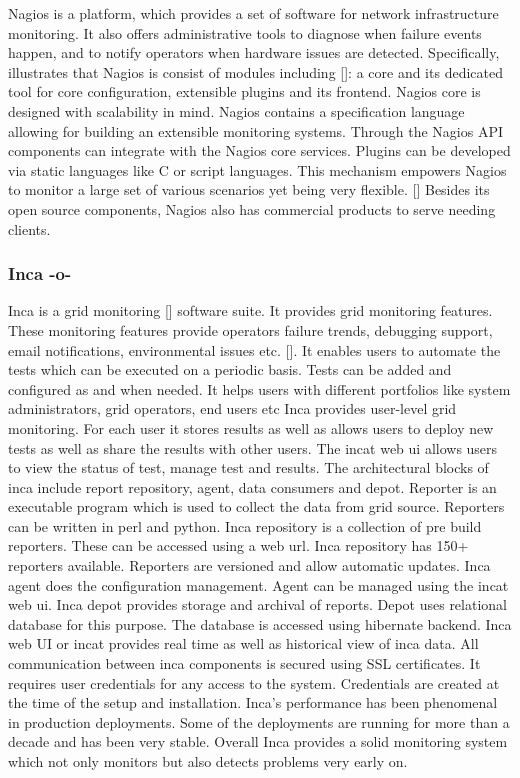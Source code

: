 Nagios is a platform, which provides a set of software for network
infrastructure monitoring. It also offers administrative tools to
diagnose when failure events happen, and to notify operators when
hardware issues are detected. Specifically, illustrates that Nagios is
consist of modules including [\cite{nagios-book}]: a core and its
dedicated tool for core configuration, extensible plugins and its
frontend. Nagios core is designed with scalability in mind.  Nagios
contains a specification language allowing for building an extensible
monitoring systems.  Through the Nagios API components can integrate
with the Nagios core services. Plugins can be developed via static
languages like C or script languages. This mechanism empowers Nagios
to monitor a large set of various scenarios yet being very
flexible. [\cite{nagios-paper-2012}] Besides its open source components,
Nagios also has commercial products to serve needing clients.


\subsubsection{Inca -o-}

Inca is a grid monitoring [\cite{inca-book}] software suite. It provides
grid monitoring features. These monitoring features provide operators
failure trends, debugging support, email notifications, environmental
issues etc. [\cite{www-inca}]. It enables users to automate the tests
which can be executed on a periodic basis. Tests can be added and
configured as and when needed. It helps users with different
portfolios like system administrators, grid operators, end users etc
Inca provides user-level grid monitoring. For each user it stores
results as well as allows users to deploy new tests as well as share
the results with other users. The incat web ui allows users to view
the status of test, manage test and results. The architectural blocks
of inca include report repository, agent, data consumers and
depot. Reporter is an executable program which is used to collect the
data from grid source. Reporters can be written in perl and
python. Inca repository is a collection of pre build reporters.  These
can be accessed using a web url. Inca repository has 150+ reporters
available. Reporters are versioned and allow automatic updates. Inca
agent does the configuration management. Agent can be managed using
the incat web ui. Inca depot provides storage and archival of
reports. Depot uses relational database for this purpose. The database
is accessed using hibernate backend.  Inca web UI or incat provides
real time as well as historical view of inca data.  All communication
between inca components is secured using SSL certificates. It requires
user credentials for any access to the system. Credentials are created
at the time of the setup and installation. Inca's performance has been
phenomenal in production deployments. Some of the deployments are
running for more than a decade and has been very stable. Overall Inca
provides a solid monitoring system which not only monitors but also
detects problems very early on.

